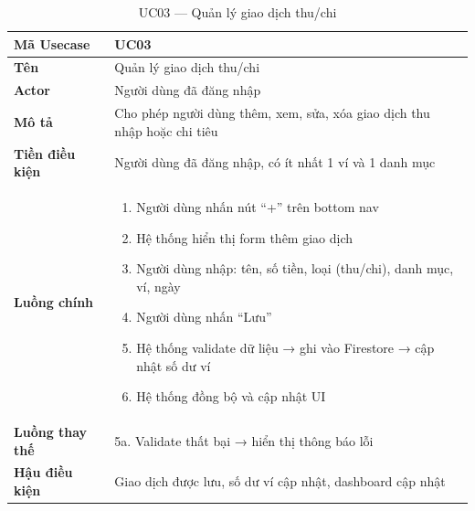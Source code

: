 \begin{table}[H]
\centering
\caption{UC03 --- Quản lý giao dịch thu/chi}
\begin{tabularx}{\textwidth}{|l|X|}
\hline
\textbf{Mã Usecase} & UC03 \\
\hline
\textbf{Tên} & Quản lý giao dịch thu/chi \\
\hline
\textbf{Actor} & Người dùng đã đăng nhập \\
\hline
\textbf{Mô tả} & Cho phép người dùng thêm, xem, sửa, xóa giao dịch thu nhập hoặc chi tiêu \\
\hline
\textbf{Tiền điều kiện} & Người dùng đã đăng nhập, có ít nhất 1 ví và 1 danh mục \\
\hline
\textbf{Luồng chính} &
\begin{enumerate}[noitemsep,leftmargin=*]
\item Người dùng nhấn nút ``+'' trên bottom nav
\item Hệ thống hiển thị form thêm giao dịch
\item Người dùng nhập: tên, số tiền, loại (thu/chi), danh mục, ví, ngày
\item Người dùng nhấn ``Lưu''
\item Hệ thống validate dữ liệu → ghi vào Firestore → cập nhật số dư ví
\item Hệ thống đồng bộ và cập nhật UI
\end{enumerate} \\
\hline
\textbf{Luồng thay thế} & 5a. Validate thất bại → hiển thị thông báo lỗi \\
\hline
\textbf{Hậu điều kiện} & Giao dịch được lưu, số dư ví cập nhật, dashboard cập nhật \\
\hline
\end{tabularx}
\end{table}

